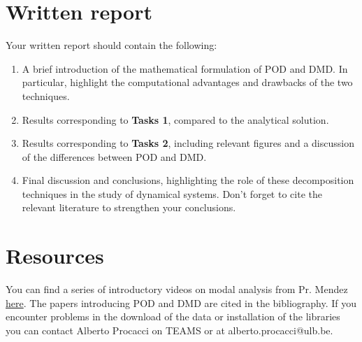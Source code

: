 \documentclass[11pt]{article}
\begin{document}
\section*{Written report}

Your written report should contain the following:

\begin{enumerate}[start=1,label={\bfseries Section \arabic*:}]
\item A brief introduction of the mathematical formulation of POD and DMD. In particular, highlight the computational advantages and drawbacks of the two techniques.
\item Results corresponding to \textbf{Tasks 1}, compared to the analytical solution.
\item Results corresponding to \textbf{Tasks 2}, including relevant figures and a discussion of the differences between POD and DMD.
\item Final discussion and conclusions, highlighting the role of these decomposition techniques in the study of dynamical systems. Don't forget to cite the relevant literature to strengthen your conclusions. 
\end{enumerate}

\section*{Resources}

You can find a series of introductory videos on modal analysis from Pr. Mendez \href{https://www.youtube.com/channel/UC-RoU7LisZSLy6o-EO4BUDA/playlists}{here}. The papers introducing POD and DMD are cited in the bibliography. If you encounter problems in the download of the data or installation of the libraries you can contact Alberto Procacci on TEAMS or at alberto.procacci@ulb.be.



\end{document}
